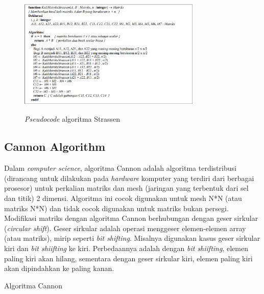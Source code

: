 \documentclass[conference]{IEEEtran}
\begin{document}
\begin{figure}[h]
    \includegraphics[width = 8.7cm, height = 6cm]{Pseudocode_Algoritma_Strassen.png}
    \centering
    \caption{\textit{Pseudocode} algoritma Strassen}
 \end{figure}

\subsection{Cannon Algorithm}
Dalam \textit{computer science}, algoritma Cannon adalah algoritma terdistribusi (dirancang untuk dilakukan pada \textit{hardware} komputer yang terdiri dari berbagai prosesor)
untuk perkalian matriks dan mesh (jaringan yang terbentuk dari sel dan titik) 2 dimensi.
Algoritma ini cocok digunakan untuk mesh N*N (atau matriks N*N) dan tidak cocok digunakan untuk matriks bukan persegi.
Modifikasi matriks dengan algoritma Cannon berhubungan dengan geser sirkular (\textit{circular shift}).
Geser sirkular adalah operasi menggeser elemen-elemen array (atau matriks), mirip seperti \textit{bit shifting}.
Misalnya digunakan kasus geser sirkular kiri dan \textit{bit shiifting} ke kiri.
Perbedaannya adalah dengan \textit{bit shiifting}, elemen paling kiri akan hilang, 
sementara dengan geser sirkular kiri, elemen paling kiri akan dipindahkan ke paling kanan.

\begin{algorithm}
    \caption{Algoritma Cannon}
    \\
\end{algorithm}
\end{document}
